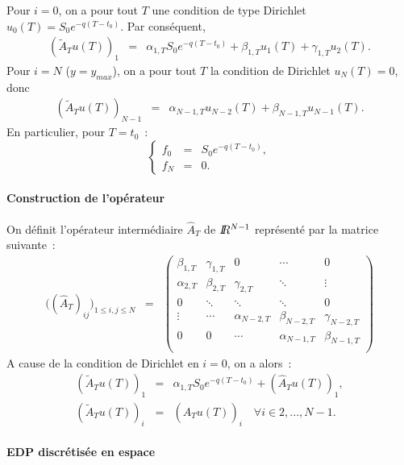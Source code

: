 Pour $i=0$, on a pour tout $T$ une condition de type Dirichlet 
$u_0(T) = S_0e^{-q(T-t_0)}$. Par cons\'equent, 
\begin{eqnarray*}
(\tilde{A}_T u(T))_1 &=& \alpha_{1,T}S_0e^{-q(T-t_0)}+
\beta_{1,T}u_1(T)+\gamma_{1,T}u_2(T).
\end{eqnarray*}
Pour $i=N$ ($y=y_{max}$), on a pour tout $T$ la condition de 
Dirichlet $u_N(T) = 0$, donc
\begin{eqnarray*}
(\tilde{A}_T u(T))_{N-1} &=& \alpha_{N-1,T}u_{N-2}(T) + 
\beta_{N-1,T}u_{N-1}(T).
\end{eqnarray*}
En particulier, pour $T=t_0$~:
$$
\left \{
\begin{array}{lll}
f_0 &=& S_0e^{-q(T-t_0)},\\
f_N &=& 0.
\end{array}
\right .
$$

\paragraph{Construction de l'op\'erateur}

On d\'efinit l'op\'erateur interm\'ediaire $\hat{A}_T$ de 
$I\!\! R^{N-1}$ repr\'esent\'e par la matrice suivante~: 
\begin{eqnarray*}
\biggl( (\hat{A}_T)_{ij} \biggr)_{1 \leq i,j \leq N} & = &  
\begin{pmatrix}
\beta_{1,T}  & \gamma_{1,T} & 0              & \cdots          
& 0              \\
\alpha_{2,T} & \beta_{2,T}  & \gamma_{2,T}   & \ddots          
& \vdots         \\
0            & \ddots       & \ddots         & \ddots          
& 0              \\
\vdots       & \cdots       & \alpha_{N-2,T} & \beta_{N-2,T}   
& \gamma_{N-2,T} \\ 
0            & 0            & \cdots         & \alpha_{N-1,T}  
& \beta_{N-1,T}  \\
\end{pmatrix}
\end{eqnarray*}
A cause de la condition de Dirichlet en $i=0$, on a alors~: 
\begin{eqnarray*}
(\tilde{A}_T u(T))_1 &=& \alpha_{1,T}S_0e^{-q(T-t_0)} + 
(\hat{A}_T u(T))_1,\\
(\tilde{A}_T u(T))_i &=& 
(\hat{A}_T u(T))_i \quad \forall i \in {2,...,N-1}.
\end{eqnarray*}

\paragraph{EDP discr\'etis\'ee en espace}

